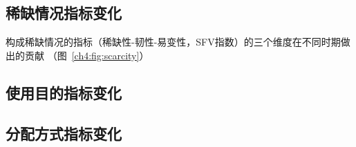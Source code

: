 \subsection{稀缺情况指标变化}

构成稀缺情况的指标（稀缺性-韧性-易变性，SFV指数）的三个维度在不同时期做出的贡献
（图~\ref{ch4:fig:scarcity}）

\subsection{使用目的指标变化}

\subsection{分配方式指标变化}
